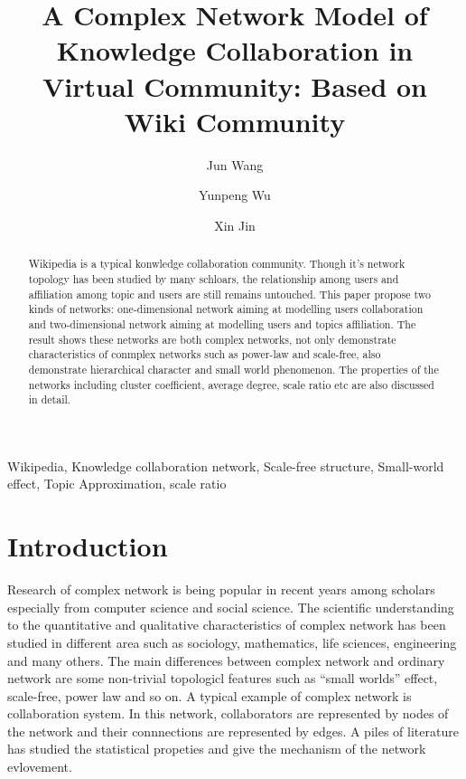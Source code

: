 \documentclass{elsarticle}
\begin{document}
\begin{frontmatter}
\title{A Complex Network Model of Knowledge Collaboration in Virtual Community: Based on Wiki Community
}
\author[buaa]{Jun Wang}

\author[buaa]{Yunpeng Wu}

\author[buaa]{Xin Jin}

\address[buaa]{School of Economics and Management, Beihang University, 
Beijing 100083, P.R. China}

\begin{abstract}
  Wikipedia is a typical konwledge collaboration community. Though
  it's network topology has been studied by many schloars, the
  relationship among users and affiliation among topic and users are
  still remains untouched. This paper propose two kinds of networks:
one-dimensional network aiming at modelling users collaboration and
two-dimensional network aiming at modelling users and topics affiliation. The
result shows these networks are both complex networks, not only demonstrate  characteristics of conmplex networks such as
power-law and scale-free, also demonstrate hierarchical character  and
small world phenomenon. The properties of the networks including
cluster coefficient, average degree, scale ratio etc are also discussed
in detail.

\end{abstract}

\begin{keyword}
Wikipedia, Knowledge collaboration network, Scale-free structure,
Small-world effect, Topic Approximation, scale ratio
  
\end{keyword}
\end{frontmatter}

\section{Introduction}
\label{sec:introduction}

Research of complex network is being popular in recent years among scholars
especially from computer science and social science.
 The scientific understanding to the quantitative and
qualitative characteristics of complex network has been studied in
different area such as sociology, mathematics, life sciences,
engineering and many others. The main differences between complex
network and ordinary network are  some non-trivial
topologicl features such as “small worlds” effect\cite{Watts2003}, scale-free\cite{PhysRevLett.90.058701},
power law\cite{wang2003cns} and so on. A typical example of complex network is collaboration system. In this network, collaborators are represented by nodes of the network
and their connnections are represented by edges. A piles of literature
has studied the statistical propeties\cite{albert-2002-74,dorogovtsev2002en,pastorsatorras2004eas} and give the mechanism of
the network evlovement.
\end{document}
